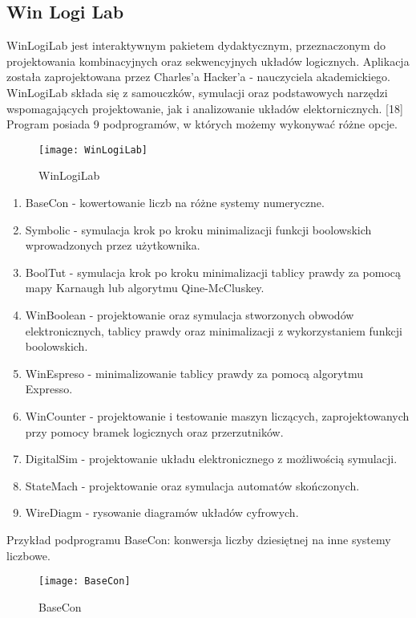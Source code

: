 \documentclass[12pt, a4paper, onside, polish]{article}				%
\begin{document}
\cleardoublepage

\subsection{Win Logi Lab}
\hspace{\parindent}
WinLogiLab jest interaktywnym pakietem dydaktycznym, przeznaczonym do projektowania kombinacyjnych oraz sekwencyjnych układów logicznych. Aplikacja została zaprojektowana przez Charles’a Hacker’a - nauczyciela akademickiego. WinLogiLab składa się z samouczków, symulacji oraz podstawowych narzędzi wspomagających projektowanie, jak i analizowanie układów elektornicznych. [18] 
\newline\newline
Program posiada 9 podprogramów, w których możemy wykonywać różne opcje.

\begin{figure}[H]
	{\centering \texttt{[image: WinLogiLab]} \caption{WinLogiLab}}\vspace{5mm}
\end{figure}

\begin{enumerate}
\item BaseCon - kowertowanie liczb na różne systemy numeryczne.
\item Symbolic - symulacja krok po kroku minimalizacji funkcji boolowskich wprowadzonych przez użytkownika.
\item BoolTut - symulacja krok po kroku minimalizacji tablicy prawdy za pomocą mapy Karnaugh lub algorytmu Qine-McCluskey.
\item WinBoolean - projektowanie oraz symulacja stworzonych obwodów elektronicznych, tablicy prawdy oraz minimalizacji z wykorzystaniem funkcji boolowskich.
\item WinEspreso - minimalizowanie tablicy prawdy za pomocą algorytmu Expresso.
\item WinCounter - projektowanie i testowanie maszyn liczących, zaprojektowanych przy pomocy bramek logicznych oraz przerzutników.
\item DigitalSim - projektowanie układu elektronicznego z możliwością symulacji.
\item StateMach - projektowanie oraz symulacja automatów skończonych.
\item WireDiagm - rysowanie diagramów układów cyfrowych. \newline
\end{enumerate}
Przykład podprogramu BaseCon: konwersja liczby dziesiętnej na inne systemy liczbowe.
	\begin{figure}[H]
		{\centering \texttt{[image: BaseCon]} \caption{BaseCon}}\vspace{5mm}
	\end{figure}
\end{document}
